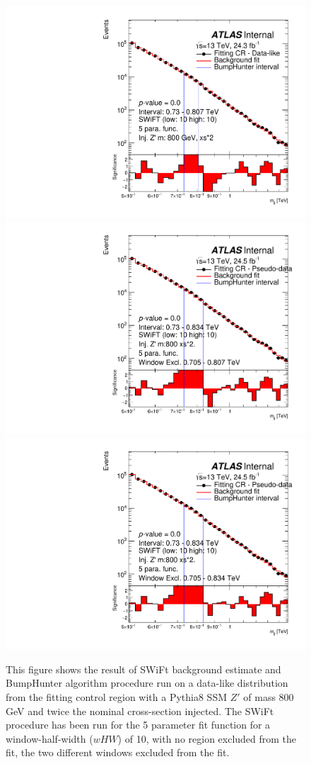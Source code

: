 \begin{figure}[!htb]
\captionsetup[subfigure]{aboveskip=0pt,justification=centering}
\centering
{} {
  \includegraphics[width=0.45\linewidth, angle=0]{figs/Dibjet/LowMass/FitStudy/bhFit_corrFitCR_dataLike_5para_low10_high10_inj_Zprimebb800_xsFactor2.pdf}
}
 {
  \includegraphics[width=0.45\linewidth, angle=0]{figs/Dibjet/LowMass/FitStudy/bhFit_corrFitCR_dataLike_5para_low10_high10_inj_Zprimebb800_xsFactor2_removedWindow.pdf}
}\\
 {
  \includegraphics[width=0.45\linewidth, angle=0]{figs/Dibjet/LowMass/FitStudy/bhFit_corrFitCR_dataLike_5para_low10_high10_inj_Zprimebb800_xsFactor2_removedWindow2.pdf}
}
\vspace{10pt}
\caption{\label{fig:bhFit_lm_corrFitCR_dataLike_inj_Zprimebb800_xsFactor2_wHW10}
  This figure shows the result of SWiFt background estimate and {\sc BumpHunter} algorithm procedure run on a data-like distribution
  from the fitting control region with a Pythia8 SSM $Z'$ of mass 800 GeV and twice the nominal cross-section injected.
  The SWiFt procedure has been run for the 5 parameter fit function for a window-half-width ($wHW$) of 10, with no region excluded from the fit, the two different windows excluded from the fit.}
\end{figure}

